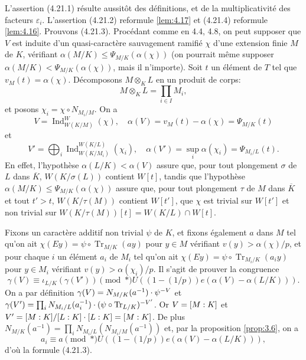 \documentclass[12pt,a4paper]{article}
\theoremstyle{plain}
\theoremstyle{definition}
\theoremstyle{remark}
\DeclareMathOperator{\Ind}{Ind}
\DeclareMathOperator{\Tr}{Tr}
\let\dim\relax\let\det\relax
\providecommand{\Tr}{\operatorname{Tr}}
\begin{document}
L'assertion (4.21.1) r\'esulte aussit\^ot des d\'efinitions, et de la multiplicativit\'e des facteurs $\varepsilon_i$. L'assertion (4.21.2) reformule \ref{lem:4.17} et (4.21.4) reformule \ref{lem:4.16}. Prouvons (4.21.3). Proc\'edant comme en 4.4, 4.8, on peut supposer que $V$ est induite d'un quasi-caract\`ere sauvagement ramifi\'e $\chi$ d'une extension finie $M$ de $K$, v\'erifiant $\alpha(M/K) \leq \Psi_{M/K}(\alpha(\chi))$ (on pourrait m\^eme supposer $\alpha(M/K) < \Psi_{M/K}(\alpha(\chi))$, mais il n'importe). Soit $t$ un \'el\'ement de $T$ tel que $v_M(t) = \alpha(\chi)$. D\'ecomposons $M \otimes_K L$ en un produit de corps:
\[
M \otimes_K L = \prod_{i \in I} M_i,
\]
et posons $\chi_i = \chi \circ N_{M_i/M}$. On a
\[
V = \Ind_{W(K/M)}^W(\chi), \quad \alpha(V) = v_M(t) - \alpha(\chi) = \Psi_{M/K}(t)
\]
et
\[
V' = \bigoplus_i \Ind_{W(K/M_i)}^{W(K/L)}(\chi_i), \quad \alpha(V') = \sup_i \alpha(\chi_i) = \Psi_{M_i/L}(t).
\]
En effet, l'hypoth\`ese $\alpha(L/K) < \alpha(V)$ assure que, pour tout plongement $\sigma$ de $L$ dans $\overline{K}$, $W(K/\sigma(L))$ contient $W[t]$, tandis que l'hypoth\`ese $\alpha(M/K) \leq \Psi_{M/K}(\alpha(\chi))$ assure que, pour tout plongement $\tau$ de $M$ dans $\overline{K}$ et tout $t' > t$, $W(K/\tau(M))$ contient $W[t']$, que $\chi$ est trivial sur $W[t']$ et non trivial sur $W(K/\tau(M))[t] = W(K/L) \cap W[t]$.

Fixons un caract\`ere additif non trivial $\psi$ de $K$, et fixons \'egalement $a$ dans $M$ tel qu'on ait $\chi(Ey) = \psi \circ \Tr_{M/K}(ay)$ pour $y \in M$ v\'erifiant $v(y) > \alpha(\chi)/p$, et pour chaque $i$ un \'el\'ement $a_i$ de $M_i$ tel qu'on ait $\chi(Ey) = \psi \circ \Tr_{M_i/K}(a_i y)$ pour $y \in M_i$ v\'erifiant $v(y) > \alpha(\chi_i)/p$. Il s'agit de prouver la congruence
\[
\gamma(V) \equiv \iota_{L/K}(\gamma(V')) \pmod{*} U((1-(1/p))e(\alpha(V) - \alpha(L/K))).
\]
On a par d\'efinition $\gamma(V) = N_{M/K}(a^{-1}) \cdot \psi^{-\dim V}$ et $\gamma(V') = \prod_i N_{M_i/L}(a_i^{-1}) \cdot (\psi \circ \Tr_{L/K})^{-\dim V'}$. Or $\dim V = [M:K]$ et $\dim V' = [M:K]/[L:K] \cdot [L:K] = [M:K]$. De plus $N_{M/K}(a^{-1}) = \prod_i N_{M_i/L}(N_{M_i/M}(a^{-1}))$ et, par la proposition \ref{prop:3.6}, on a
\[
a_i \equiv a \pmod{*} U((1-(1/p))e(\alpha(V) - \alpha(L/K))),
\]
d'o\`u la formule (4.21.3).
\end{document}
